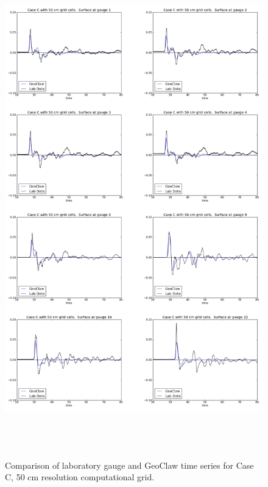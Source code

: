 \begin{figure}[ht]
\hfil\includegraphics[height=8.5in]{bp6/C50Gages.png}\hfil
\caption{\label{C50Gages}
Comparison of laboratory gauge and GeoClaw time series for Case C, 50 cm resolution computational grid.
  }
\end{figure}


